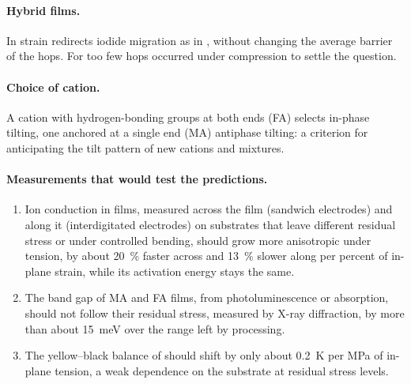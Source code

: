 \paragraph{Hybrid films.} In \MASnI{} strain redirects iodide migration as in \CsSnI{}, without changing the
average barrier of the hops. For \FASnI{} too few hops occurred under compression to settle the question.

\paragraph{Choice of cation.} A cation with hydrogen-bonding groups at both ends (FA) selects in-phase tilting, one
anchored at a single end (MA) antiphase tilting: a criterion for anticipating the tilt pattern of new cations and
mixtures.

\paragraph{Measurements that would test the predictions.}
\begin{enumerate}[leftmargin=14pt, itemsep=1pt, topsep=2pt]
  \item Ion conduction in \CsSnI{} films, measured across the film (sandwich electrodes) and along it (interdigitated
    electrodes) on substrates that leave different residual stress or under controlled bending, should grow more
    anisotropic under tension, by about \SI{20}{\percent} faster across and \SI{13}{\percent} slower along per percent of
    in-plane strain, while its activation energy stays the same.
  \item The band gap of MA and FA films, from photoluminescence or absorption, should not follow their residual
    stress, measured by X-ray diffraction, by more than about \SI{15}{meV} over the range left by processing.
  \item The yellow--black balance of \CsSnI{} should shift by only about \SI{0.2}{K} per MPa of in-plane tension, a weak
    dependence on the substrate at residual stress levels.
\end{enumerate}

